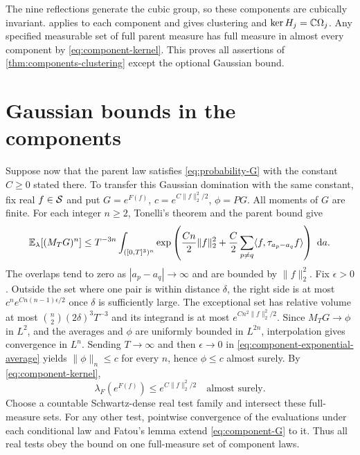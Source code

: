 The nine reflections generate the cubic group, so these components
are cubically invariant.  applies
to each component and gives clustering and
$\ker H_j=\mathbb C\Omega_j$. Any specified measurable set of full parent
measure has full measure in almost every component by
\eqref{eq:component-kernel}. This proves all assertions of
\cref{thm:components-clustering} except the optional Gaussian bound.

\section{Gaussian bounds in the components}\label{sec:component-gaussian}
Suppose now that the parent law satisfies
\eqref{eq:probability-G} with the constant $C\ge0$ stated there. To transfer this Gaussian domination with
the same constant, fix real
$f\in\mathcal S$ and put $G=e^{F(f)}$, $c=e^{C\|f\|_2^2/2}$,
$\phi=PG$. All moments of $G$ are finite. For each integer $n\ge2$,
Tonelli's theorem and the parent bound give
\begin{equation}\label{eq:component-exponential-average}
 \mathbb E_\lambda[(M_TG)^n]\le T^{-3n}
 \int_{([0,T]^3)^n}
 \exp\left(\frac {Cn}2\|f\|_2^2+
       \frac C2\sum_{p\ne q}\langle f,\tau_{a_p-a_q}f\rangle\right)\,\,\mathrm d a.
\end{equation}
The overlaps tend to zero as $|a_p-a_q|\to\infty$ and are bounded
by $\|f\|_2^2$. Fix $\epsilon>0$. Outside the set where one pair is within distance
$\delta$, the right side is at most
$c^n e^{Cn(n-1)\epsilon/2}$ once $\delta$ is sufficiently large.
The exceptional set has relative volume at most
$\binom n2(2\delta)^3T^{-3}$ and its integrand is at most
$e^{Cn^2\|f\|_2^2/2}$.
Since $M_TG\to\phi$ in $L^2$, and the averages and $\phi$ are
uniformly bounded in $L^{2n}$, interpolation gives convergence in
$L^n$. Sending $T\to\infty$ and then $\epsilon\to0$ in
\eqref{eq:component-exponential-average} yields
$\|\phi\|_n\le c$ for every $n$, hence $\phi\le c$ almost surely.
By \eqref{eq:component-kernel},
\begin{equation}\label{eq:component-G}
 \lambda_F(e^{F(f)})\le e^{C\|f\|_2^2/2}\quad\text{almost surely}.
\end{equation}
Choose a countable Schwartz-dense real test family and intersect
these full-measure sets. For any other test, pointwise convergence
of the evaluations under each conditional law and Fatou's lemma
extend \eqref{eq:component-G} to it. Thus all real tests obey the
bound on one full-measure set of component laws.

